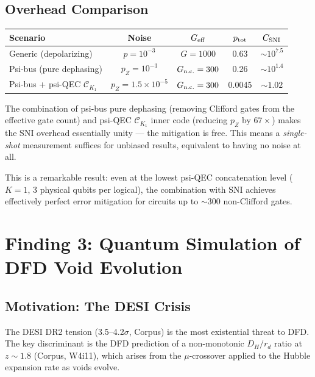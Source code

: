 \documentclass[11pt]{article}
\theoremstyle{definition}
\theoremstyle{remark}
\newcommand{\CK}{\mathcal{C}_K}
\newcommand{\ee}[1]{\times 10^{#1}}
\begin{document}
\subsection{Overhead Comparison}
\label{sec:overhead-comparison}

\begin{center}
\begin{tabular}{@{}lcccc@{}}
\toprule
Scenario & Noise & $G_{\rm eff}$ & $p_{\rm tot}$ & $C_{\rm SNI}$ \\
\midrule
Generic (depolarizing) & $p = 10^{-3}$ & $G = 1000$ & 0.63 & $\sim 10^{7.5}$ \\
Psi-bus (pure dephasing) & $p_Z = 10^{-3}$ & $G_{\rm n.c.} = 300$ & 0.26 & $\sim 10^{1.4}$ \\
Psi-bus + psi-QEC $\CK_1$ & $p_Z = 1.5\ee{-5}$ & $G_{\rm n.c.} = 300$ & 0.0045 & $\sim 1.02$ \\
\bottomrule
\end{tabular}
\end{center}

The combination of psi-bus pure dephasing (removing Clifford gates from
the effective gate count) and psi-QEC $\CK_1$ inner code (reducing $p_Z$
by $67\times$) makes the SNI overhead essentially unity --- the mitigation
is free.  This means a \emph{single-shot} measurement suffices for
unbiased results, equivalent to having no noise at all.

This is a remarkable result: even at the lowest psi-QEC concatenation
level ($K = 1$, 3 physical qubits per logical), the combination with
SNI achieves effectively perfect error mitigation for circuits up to
$\sim 300$ non-Clifford gates.

\section{Finding 3: Quantum Simulation of DFD Void Evolution}
\label{sec:void-simulation}

\subsection{Motivation: The DESI Crisis}
\label{sec:desi-motivation}

The DESI DR2 tension (3.5--4.2$\sigma$, Corpus) is the most existential
threat to DFD.  The key discriminant is the DFD prediction of a
non-monotonic $D_H/r_d$ ratio at $z \sim 1.8$ (Corpus, W4i11), which
arises from the $\mu$-crossover applied to the Hubble expansion rate
as voids evolve.
\end{document}
